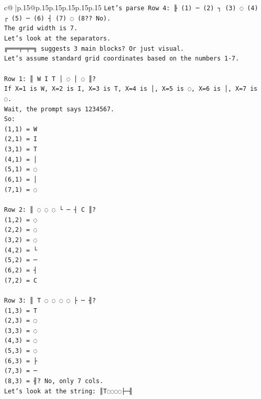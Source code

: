 \documentclass{article}
\begin{document}
{\begin{supertabular}{c@{$\;$}|p{.15\linewidth}@{}p{.15\linewidth}p{.15\linewidth}p{.15\linewidth}p{.15\linewidth}p{.15\linewidth}}
{{{\texttt{Let's parse Row 4: ╟ (1) ─ (2) ┐ (3) ◌ (4) ┌ (5) ─ (6) ┤ (7) ◌ (8?? No).} \\
\texttt{The grid width is 7.} \\
\texttt{Let's look at the separators.} \\
\texttt{╔═══╤═╤═╗ suggests 3 main blocks? Or just visual.} \\
\texttt{Let's assume standard grid coordinates based on the numbers 1{-}7.} \\
\\ 
\texttt{Row 1: ║ W I T │ ◌ │ ◌ ║?} \\
\texttt{If X=1 is W, X=2 is I, X=3 is T, X=4 is │, X=5 is ◌, X=6 is │, X=7 is ◌.} \\
\texttt{Wait, the prompt says 1234567.} \\
\texttt{So:} \\
\texttt{(1,1) = W} \\
\texttt{(2,1) = I} \\
\texttt{(3,1) = T} \\
\texttt{(4,1) = │} \\
\texttt{(5,1) = ◌} \\
\texttt{(6,1) = │} \\
\texttt{(7,1) = ◌} \\
\\ 
\texttt{Row 2: ║ ◌ ◌ ◌ └ ─ ┤ C ║?} \\
\texttt{(1,2) = ◌} \\
\texttt{(2,2) = ◌} \\
\texttt{(3,2) = ◌} \\
\texttt{(4,2) = └} \\
\texttt{(5,2) = ─} \\
\texttt{(6,2) = ┤} \\
\texttt{(7,2) = C} \\
\\ 
\texttt{Row 3: ║ T ◌ ◌ ◌ ◌ ├ ─ ╢?} \\
\texttt{(1,3) = T} \\
\texttt{(2,3) = ◌} \\
\texttt{(3,3) = ◌} \\
\texttt{(4,3) = ◌} \\
\texttt{(5,3) = ◌} \\
\texttt{(6,3) = ├} \\
\texttt{(7,3) = ─} \\
\texttt{(8,3) = ╢? No, only 7 cols.} \\
\texttt{Let's look at the string: ║T◌◌◌◌├─╢} \\
}}}
\end{supertabular}}
\end{document}
